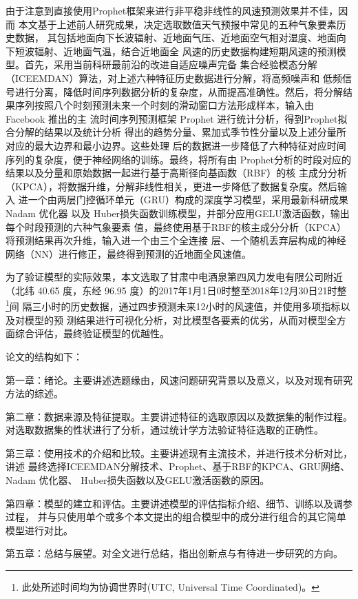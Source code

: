 \documentclass[AutoFakeBold]{LZUThesis}
\begin{document}
由于注意到直接使用Prophet框架来进行非平稳非线性的风速预测效果并不佳，因而
本文基于上述前人研究成果，决定选取数值天气预报中常见的五种气象要素历史数据，
其包括地面向下长波辐射、近地面气压、近地面空气相对湿度、地面向下短波辐射、近地面气温，结合近地面全
风速的历史数据构建短期风速的预测模型。首先，采用当前科研最前沿的改进自适应噪声完备
集合经验模态分解（ICEEMDAN）算法，对上述六种特征历史数据进行分解，将高频噪声和
低频信号进行分离，降低时间序列数据分析的复杂度，从而提高准确性。然后，将分解结
果序列按照八个时刻预测未来一个时刻的滑动窗口方法形成样本，输入由 Facebook 推出的主
流时间序列预测框架 Prophet 进行统计分析，得到Prophet拟合分解的结果以及统计分析
得出的趋势分量、累加式季节性分量以及上述分量所对应的最大边界和最小边界。这些处理
后的数据进一步降低了六种特征对应时间序列的复杂度，便于神经网络的训练。最终，将所有由
Prophet分析的时段对应的结果以及分量和原始数据一起进行基于高斯径向基函数（RBF）的核
主成分分析（KPCA），将数据升维，分解非线性相关，更进一步降低了数据复杂度。然后输入
进一个由两层门控循环单元（GRU）构成的深度学习模型，采用最新科研成果 Nadam 优化器
以及 Huber损失函数训练模型，并部分应用GELU激活函数，输出每个时段预测的六种气象要素
值，最终使用基于RBF的核主成分分析（KPCA）将预测结果再次升维，输入进一个由三个全连接
层、一个随机丢弃层构成的神经网络（NN）进行修正，最终得到预测的近地面全风速值。

为了验证模型的实际效果，本文选取了甘肃中电酒泉第四风力发电有限公司附近（北纬
40.65 度，东经 96.95 度）的2017年1月1日0时整至2018年12月30日21时整
\footnote{此处所述时间均为协调世界时(UTC, Universal Time Coordinated)。}间
隔三小时的历史数据，通过四步预测未来12小时的风速值，并使用多项指标以及对模型的预
测结果进行可视化分析，对比模型各要素的优劣，从而对模型全方面综合评估，最终验证模型的优越性。

论文的结构如下：

第一章：绪论。主要讲述选题缘由，风速问题研究背景以及意义，以及对现有研究
方法的综述。

第二章：数据来源及特征提取。主要讲述特征的选取原因以及数据集的制作过程。
对选取数据集的性状进行了分析，通过统计学方法验证特征选取的正确性。

第三章：使用技术的介绍和比较。主要讲述现有主流技术，并进行技术分析对比，讲述
最终选择ICEEMDAN分解技术、Prophet、基于RBF的KPCA、GRU网络、Nadam 优化器、
Huber损失函数以及GELU激活函数的原因。

第四章：模型的建立和评估。主要讲述模型的评估指标介绍、细节、训练以及调参过程，
并与只使用单个或多个本文提出的组合模型中的成分进行组合的其它简单模型进行对比。

第五章：总结与展望。对全文进行总结，指出创新点与有待进一步研究的方向。
\end{document}
